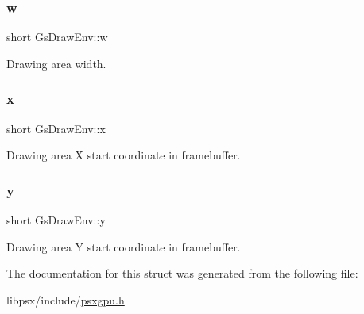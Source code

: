 \subsubsection{\texorpdfstring{w}{w}}
{\footnotesize\ttfamily short Gs\+Draw\+Env\+::w}



Drawing area width. 

\mbox{\label{structGsDrawEnv_a6fb0977769dc3447f2f1679dc99d1a86}} 
\subsubsection{\texorpdfstring{x}{x}}
{\footnotesize\ttfamily short Gs\+Draw\+Env\+::x}



Drawing area X start coordinate in framebuffer. 

\mbox{\label{structGsDrawEnv_a9a6e3bb414996687c92f747fdaefd394}} 
\subsubsection{\texorpdfstring{y}{y}}
{\footnotesize\ttfamily short Gs\+Draw\+Env\+::y}



Drawing area Y start coordinate in framebuffer. 



The documentation for this struct was generated from the following file\+:\begin{DoxyCompactItemize}
\item 
libpsx/include/\hyperlink{psxgpu_8h}{psxgpu.\+h}\end{DoxyCompactItemize}

